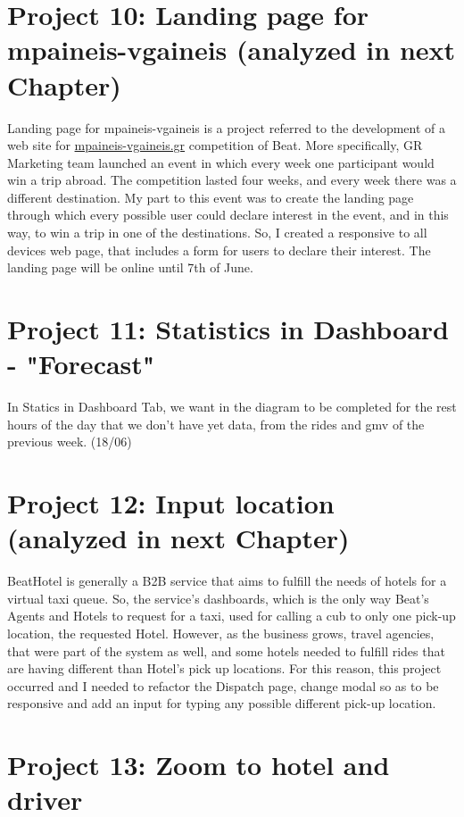 \section{Project 10: Landing page for mpaineis-vgaineis (analyzed in next Chapter)}

Landing page for mpaineis-vgaineis is a project referred to the development of a web site for \url{mpaineis-vgaineis.gr} competition of Beat. More specifically, GR Marketing team launched an event in which every week one participant would win a trip abroad. The competition lasted four weeks, and every week there was a different destination. My part to this event was to create the landing page through which every possible user could declare interest in the event, and in this way, to win a trip in one of the destinations. So, I created a responsive to all devices web page, that includes a form for users to declare their interest. The landing page will be online until 7th of June. \par

\section{Project 11: Statistics in Dashboard - "Forecast"}
In Statics in Dashboard Tab, we want in the diagram to be completed for the rest hours of the day that we don't have yet data, from the rides and gmv of the previous week. (18/06)

\section{Project 12: Input location (analyzed in next Chapter)}

BeatHotel is generally a B2B service that aims to fulfill the needs of hotels for a virtual taxi queue. So, the service's dashboards, which is the only way Beat's Agents and Hotels to request for a taxi, used for calling a cub to only one pick-up location, the requested Hotel. However, as the business grows, travel agencies, that were part of the system as well, and some hotels needed to fulfill rides that are having different than Hotel's pick up locations. For this reason, this project occurred and I needed to refactor the Dispatch page, change modal so as to be responsive and add an input for typing any possible different pick-up location. \par

\section{Project 13: Zoom to hotel and driver}

